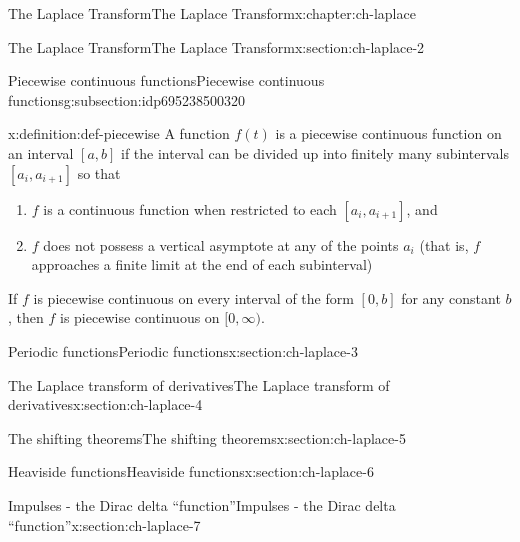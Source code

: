 \documentclass[oneside,10pt,]{book}
\numberwithin{equation}{section}
\numberwithin{equation}{section}
\begin{document}
\begin{chapterptx}{The Laplace Transform}{}{The Laplace Transform}{}{}{x:chapter:ch-laplace}
\begin{sectionptx}{The Laplace Transform}{}{The Laplace Transform}{}{}{x:section:ch-laplace-2}
\begin{subsectionptx}{Piecewise continuous functions}{}{Piecewise continuous functions}{}{}{g:subsection:idp695238500320}
\begin{definition}{}{x:definition:def-piecewise}
A function \(f(t)\) is a piecewise continuous function on an interval \([a,b]\) if the interval can be divided up into finitely many subintervals \([a_i,a_{i+1}]\) so that%
\begin{enumerate}
\item{}\(f\) is a continuous function when restricted to each \([a_i,a_{i+1}]\), and%
\item{}\(f\) does not possess a  vertical asymptote at any of the points \(a_i\) (that is, \(f\) approaches a finite limit at the end of each subinterval)%
\end{enumerate}
If \(f\) is piecewise continuous on every interval of the form \([0,b]\) for any constant \(b\), then \(f\) is piecewise continuous on \([0,\infty)\).%
\end{definition}
\end{subsectionptx}
\end{sectionptx}
%
%
\typeout{************************************************}
\typeout{************************************************}
%
\begin{sectionptx}{Periodic functions}{}{Periodic functions}{}{}{x:section:ch-laplace-3}
\end{sectionptx}
%
%
\typeout{************************************************}
\typeout{************************************************}
%
\begin{sectionptx}{The Laplace transform of derivatives}{}{The Laplace transform of derivatives}{}{}{x:section:ch-laplace-4}
\end{sectionptx}
%
%
\typeout{************************************************}
\typeout{************************************************}
%
\begin{sectionptx}{The shifting theorems}{}{The shifting theorems}{}{}{x:section:ch-laplace-5}
\end{sectionptx}
%
%
\typeout{************************************************}
\typeout{************************************************}
%
\begin{sectionptx}{Heaviside functions}{}{Heaviside functions}{}{}{x:section:ch-laplace-6}
\end{sectionptx}
%
%
\typeout{************************************************}
\typeout{************************************************}
%
\begin{sectionptx}{Impulses - the Dirac delta ``function''}{}{Impulses - the Dirac delta ``function''}{}{}{x:section:ch-laplace-7}

\end{sectionptx}
\end{chapterptx}
\end{document}
